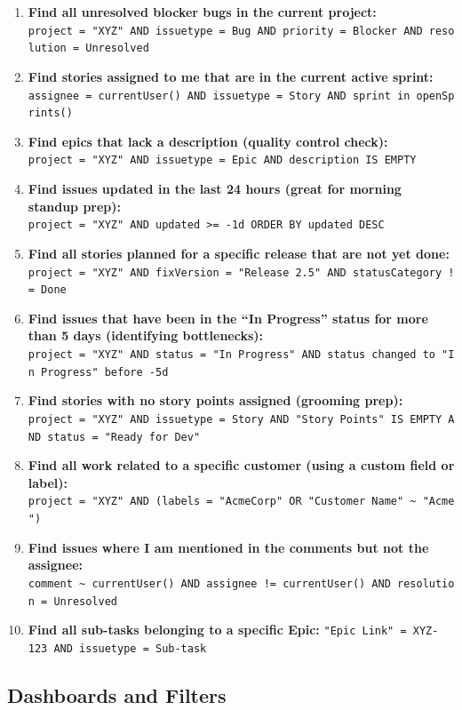 \begin{enumerate}
\def\labelenumi{\arabic{enumi}.}
\item
  \textbf{Find all unresolved blocker bugs in the current project:}
  \texttt{project\ =\ "XYZ"\ AND\ issuetype\ =\ Bug\ AND\ priority\ =\ Blocker\ AND\ resolution\ =\ Unresolved}
\item
  \textbf{Find stories assigned to me that are in the current active
  sprint:}
  \texttt{assignee\ =\ currentUser()\ AND\ issuetype\ =\ Story\ AND\ sprint\ in\ openSprints()}
\item
  \textbf{Find epics that lack a description (quality control check):}
  \texttt{project\ =\ "XYZ"\ AND\ issuetype\ =\ Epic\ AND\ description\ IS\ EMPTY}
\item
  \textbf{Find issues updated in the last 24 hours (great for morning
  standup prep):}
  \texttt{project\ =\ "XYZ"\ AND\ updated\ \textgreater{}=\ -1d\ ORDER\ BY\ updated\ DESC}
\item
  \textbf{Find all stories planned for a specific release that are not
  yet done:}
  \texttt{project\ =\ "XYZ"\ AND\ fixVersion\ =\ "Release\ 2.5"\ AND\ statusCategory\ !=\ Done}
\item
  \textbf{Find issues that have been in the ``In Progress'' status for
  more than 5 days (identifying bottlenecks):}
  \texttt{project\ =\ "XYZ"\ AND\ status\ =\ "In\ Progress"\ AND\ status\ changed\ to\ "In\ Progress"\ before\ -5d}
\item
  \textbf{Find stories with no story points assigned (grooming prep):}
  \texttt{project\ =\ "XYZ"\ AND\ issuetype\ =\ Story\ AND\ "Story\ Points"\ IS\ EMPTY\ AND\ status\ =\ "Ready\ for\ Dev"}
\item
  \textbf{Find all work related to a specific customer (using a custom
  field or label):}
  \texttt{project\ =\ "XYZ"\ AND\ (labels\ =\ "AcmeCorp"\ OR\ "Customer\ Name"\ \textasciitilde{}\ "Acme")}
\item
  \textbf{Find issues where I am mentioned in the comments but not the
  assignee:}
  \texttt{comment\ \textasciitilde{}\ currentUser()\ AND\ assignee\ !=\ currentUser()\ AND\ resolution\ =\ Unresolved}
\item
  \textbf{Find all sub-tasks belonging to a specific Epic:}
  \texttt{"Epic\ Link"\ =\ XYZ-123\ AND\ issuetype\ =\ Sub-task}
\end{enumerate}

\subsection{Dashboards and Filters}\label{dashboards-and-filters}

